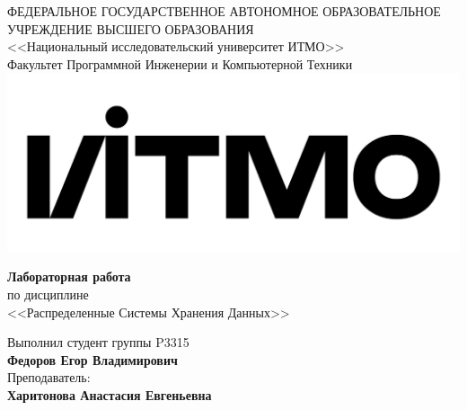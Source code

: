 \begin{titlepage}
	\thispagestyle{firststyle}
	\begin{center}
		ФЕДЕРАЛЬНОЕ ГОСУДАРСТВЕННОЕ АВТОНОМНОЕ ОБРАЗОВАТЕЛЬНОЕ УЧРЕЖДЕНИЕ ВЫСШЕГО ОБРАЗОВАНИЯ\\
		\vspace{0.5cm}
		<<Национальный исследовательский университет ИТМО>>\\
		Факультет Программной Инженерии и Компьютерной Техники \\
		\vspace{1cm}
		\includegraphics[scale=0.1]{assets/itmo_logo.png}
	\end{center}

	\vspace{1cm}

	\begin{center}
		\large
		\textbf{Лабораторная работа }\\
		по дисциплине\\
		<<Распределенные Системы Хранения Данных>> \\
	\end{center}

	\vspace{2cm}

	\begin{flushright}
		Выполнил студент группы P3315\\
		\textbf{Федоров Егор Владимирович} \\
		Преподаватель: \\
		\textbf{Харитонова Анастасия Евгеньевна}\\
	\end{flushright}

\end{titlepage}

